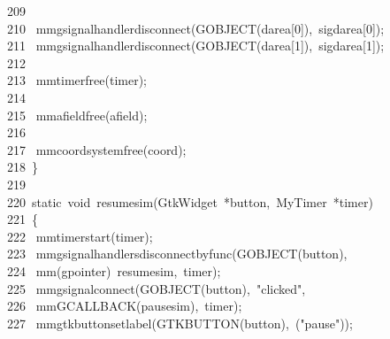 \documentclass[10pt,a4paper]{article}
\newcommand{\hlstd}[1]{\textcolor[rgb]{0,0,0}{#1}}
\newcommand{\hlnum}[1]{\textcolor[rgb]{0.16,0.16,1}{#1}}
\newcommand{\hltyp}[1]{\textcolor[rgb]{0.51,0,0}{#1}}
\newcommand{\hlstr}[1]{\textcolor[rgb]{1,0,0}{#1}}
\newcommand{\hlline}[1]{\textcolor[rgb]{0.33,0.33,0.33}{#1}}
\begin{document}
{}\hlline{\ 209\ }\hlstd{\mbox{}\\
}\hlline{\ 210\ }\hlstd{\hlstd{ mm}g\textunderscore signal\textunderscore handler\textunderscore disconnect(G\textunderscore OBJECT(darea[}\hlnum{0}\hlstd{]),\ sig\textunderscore darea[}\hlnum{0}\hlstd{]);\mbox{}\\
}\hlline{\ 211\ }\hlstd{\hlstd{ mm}g\textunderscore signal\textunderscore handler\textunderscore disconnect(G\textunderscore OBJECT(darea[}\hlnum{1}\hlstd{]),\ sig\textunderscore darea[}\hlnum{1}\hlstd{]);\mbox{}\\
}\hlline{\ 212\ }\hlstd{\mbox{}\\
}\hlline{\ 213\ }\hlstd{\hlstd{ mm}timer\textunderscore free(timer);\mbox{}\\
}\hlline{\ 214\ }\hlstd{\mbox{}\\
}\hlline{\ 215\ }\hlstd{\hlstd{ mm}afield\textunderscore free(afield);\mbox{}\\
}\hlline{\ 216\ }\hlstd{\mbox{}\\
}\hlline{\ 217\ }\hlstd{\hlstd{ mm}coord\textunderscore system\textunderscore free(coord);\mbox{}\\
}\hlline{\ 218\ }\hlstd{\}\mbox{}\\
}\hlline{\ 219\ }\hlstd{\mbox{}\\
}\hlline{\ 220\ }\hlstd{}\hltyp{static\ void\ }\hlstd{resume\textunderscore sim(GtkWidget\ *button,\ MyTimer\ *timer)\mbox{}\\
}\hlline{\ 221\ }\hlstd{\{\mbox{}\\
}\hlline{\ 222\ }\hlstd{\hlstd{ mm}timer\textunderscore start(timer);\mbox{}\\
}\hlline{\ 223\ }\hlstd{\hlstd{ mm}g\textunderscore signal\textunderscore handlers\textunderscore disconnect\textunderscore by\textunderscore func(G\textunderscore OBJECT(button),\mbox{}\\
}\hlline{\ 224\ }\hlstd{\hlstd{ mm}(gpointer)\ resume\textunderscore sim,\ timer);\mbox{}\\
}\hlline{\ 225\ }\hlstd{\hlstd{ mm}g\textunderscore signal\textunderscore connect(G\textunderscore OBJECT(button),\ }\hlstr{"clicked"}\hlstd{,\mbox{}\\
}\hlline{\ 226\ }\hlstd{\hlstd{ mm}G\textunderscore CALLBACK(pause\textunderscore sim),\ timer);\mbox{}\\
}\hlline{\ 227\ }\hlstd{\hlstd{ mm}gtk\textunderscore button\textunderscore set\textunderscore label(GTK\textunderscore BUTTON(button),\ \textunderscore (}\hlstr{"pause"}\hlstd{));\mbox{}\\
}
\end{document}
